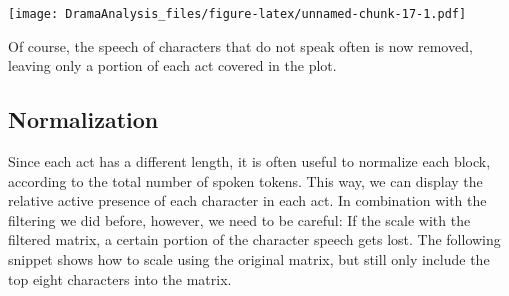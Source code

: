 \documentclass[]{book}
\begin{document}
\texttt{[image: DramaAnalysis\_files/figure-latex/unnamed-chunk-17-1.pdf]}

Of course, the speech of characters that do not speak often is now removed, leaving only a portion of each act covered in the plot.

\hypertarget{normalization}{%
\subsection{Normalization}\label{normalization}}

Since each act has a different length, it is often useful to normalize each block, according to the total number of spoken tokens. This way, we can display the relative active presence of each character in each act. In combination with the filtering we did before, however, we need to be careful: If the scale with the filtered matrix, a certain portion of the character speech gets lost. The following snippet shows how to scale using the original matrix, but still only include the top eight characters into the matrix.
\end{document}
